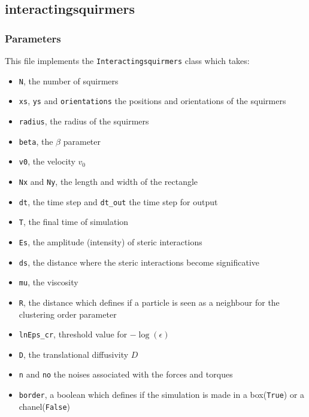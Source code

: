 \documentclass{article}
\begin{document}
\subsection{interactingsquirmers}
\subsubsection*{Parameters}
This file implements the \texttt{Interactingsquirmers} class which takes:
\begin{itemize}
   \item \texttt{N}, the number of squirmers
   \item \texttt{xs}, \texttt{ys} and \texttt{orientations} the positions and orientations of the squirmers
   \item \texttt{radius}, the radius of the squirmers
   \item \texttt{beta}, the $\beta$ parameter
   \item \texttt{v0}, the velocity $v_0$
   \item \texttt{Nx} and \texttt{Ny}, the length and width of the rectangle
   \item \texttt{dt}, the time step and \texttt{dt\_out} the time step for output
   \item \texttt{T}, the final time of simulation
   \item \texttt{Es}, the amplitude (intensity) of steric interactions
   \item \texttt{ds}, the distance where the steric interactions become significative
   \item \texttt{mu}, the viscosity
   \item \texttt{R}, the distance which defines if a particle is seen as a neighbour for the clustering order parameter
   \item \texttt{lnEps\_cr}, threshold value for \( -\log(\epsilon) \)
   \item \texttt{D}, the translational diffusivity $D$
   \item \texttt{n} and \texttt{no} the noises associated with the forces and torques
   \item \texttt{border}, a boolean which defines if the simulation is made in a box(\texttt{True}) or a chanel(\texttt{False})
\end{itemize}
\end{document}
